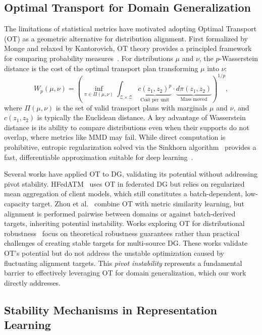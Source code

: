\subsection{Optimal Transport for Domain Generalization}

The limitations of statistical metrics have motivated adopting Optimal Transport (OT) as a geometric alternative for distribution alignment. First formalized by Monge and relaxed by Kantorovich, OT theory provides a principled framework for comparing probability measures~\citep{villani2009optimal}. For distributions $\mu$ and $\nu$, the $p$-Wasserstein distance is the cost of the optimal transport plan transforming $\mu$ into $\nu$:
\begin{equation}
    W_p(\mu, \nu) = \left( \inf_{\pi \in \Pi(\mu, \nu)} \int_{\mathcal{Z} \times \mathcal{Z}} \underbrace{c(z_1, z_2)^p}_{\text{Cost per unit}} \cdot \underbrace{d\pi(z_1, z_2)}_{\text{Mass moved}} \right)^{1/p},
\end{equation}
where $\Pi(\mu, \nu)$ is the set of valid transport plans with marginals $\mu$ and $\nu$, and $c(z_1, z_2)$ is typically the Euclidean distance. A key advantage of Wasserstein distance is its ability to compare distributions even when their supports do not overlap, where metrics like MMD may fail. While direct computation is prohibitive, entropic regularization solved via the Sinkhorn algorithm~\citep{cuturi2013sinkhorn} provides a fast, differentiable approximation suitable for deep learning~\citep{peyre2019computational}.

Several works have applied OT to DG, validating its potential without addressing pivot stability. HFedATM~\citep{wang2021hfedatm} uses OT in federated DG but relies on regularized mean aggregation of client models, which still constitutes a batch-dependent, low-capacity target. Zhou et al.~\citep{zhou2021domain} combine OT with metric similarity learning, but alignment is performed pairwise between domains or against batch-derived targets, inheriting potential instability. Works exploring OT for distributional robustness~\citep{gao2023optimal} focus on theoretical robustness guarantees rather than practical challenges of creating stable targets for multi-source DG. These works validate OT's potential but do not address the unstable optimization caused by fluctuating alignment targets. This \textit{pivot instability} represents a fundamental barrier to effectively leveraging OT for domain generalization, which our work directly addresses.

\subsection{Stability Mechanisms in Representation Learning}
\label{sec:stability_mechanisms}

